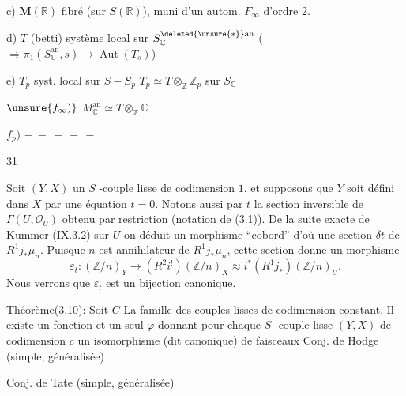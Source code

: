 c) $\mathbf M(\mathbb R)$ fibré  (sur $S(\mathbb R)$), muni d'un autom. $F_\infty$ d'ordre $2$.

d)  $T$ (betti) système local sur $S_{\mathbb C}^{\deleted{\unsure{*}}\mathrm{an}}$ ($\Rightarrow\pi_1(S_{\mathbb C}^{\mathrm{an}},s)\to\operatorname{Aut}(T_s)$)

e) $T_p$ syst. local sur $S-S_p$ \qquad $T_p\simeq T\otimes_{\mathbb Z}\mathbb Z_p$ sur $S_{\mathbb C}$

$\unsure{f_\infty)}$ $M_{\mathbb C}^{\mathrm{an}}\simeq T\otimes_{\mathbb Z}\mathbb C$

$f_p)$ \qquad $-\ -\ -\ -\ -$
\begin{flushright}31\end{flushright}
Soit $(Y,X)$ un $S$ -couple lisse de codimension $1$, et supposons que $Y$ soit défini dans $X$ par une équation $t=0$. Notons aussi par $t$ la section inversible de $\Gamma(U,\mathcal O_U)$ obtenu par restriction (notation de (3.1)). De la suite exacte de Kummer (IX.3.2) sur $U$
on déduit un morphisme ``cobord''
d'où une section $\delta t$ de $R^1j_*\mu_n$. Puisque $n$ est annihilateur de $R^1j_*\mu_n$, cette section donne un morphisme
\[
\tag{3.9}
\varepsilon_t:(\mathbb Z/n)_Y\longrightarrow(R^2i^!)(\mathbb Z/n)_X\approx i^*(R^1j_*)(\mathbb Z/n)_U.
\]
Nous verrons que $\varepsilon_t$ est un bijection canonique.

\uline{Théorème(3.10):} Soit $C$ La famille des couples lisses de codimension constant. Il existe un fonction et un seul $\varphi$ donnant pour chaque $S$ -couple lisse $(Y,X)$ de codimension $c$  un isomorphisme (dit canonique) de faisceaux
Conj. de Hodge (simple, généralisée)

Conj. de Tate (simple, généralisée)

